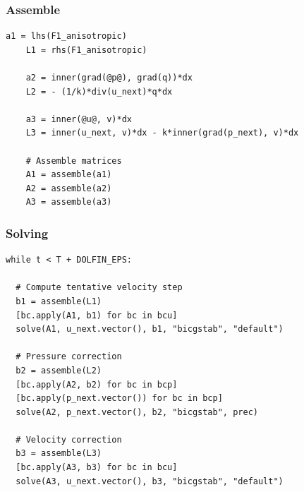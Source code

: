 \documentclass{beamer}
\begin{document}
\begin{frame}[fragile]
\frametitle{Assemble}
\scriptsize
\begin{lstlisting}[frame=single,style=base]
    a1 = lhs(F1_anisotropic)
    L1 = rhs(F1_anisotropic)

    a2 = inner(grad(@p@), grad(q))*dx
    L2 = - (1/k)*div(u_next)*q*dx

    a3 = inner(@u@, v)*dx
    L3 = inner(u_next, v)*dx - k*inner(grad(p_next), v)*dx

    # Assemble matrices
    A1 = assemble(a1)
    A2 = assemble(a2)
    A3 = assemble(a3)
\end{lstlisting}
\end{frame}




\begin{frame}[fragile]
\frametitle{Solving}
\scriptsize
\begin{lstlisting}[frame=single,style=base]
while t < T + DOLFIN_EPS:

  # Compute tentative velocity step
  b1 = assemble(L1)
  [bc.apply(A1, b1) for bc in bcu]
  solve(A1, u_next.vector(), b1, "bicgstab", "default")

  # Pressure correction
  b2 = assemble(L2)
  [bc.apply(A2, b2) for bc in bcp]
  [bc.apply(p_next.vector()) for bc in bcp]
  solve(A2, p_next.vector(), b2, "bicgstab", prec)

  # Velocity correction
  b3 = assemble(L3)
  [bc.apply(A3, b3) for bc in bcu]
  solve(A3, u_next.vector(), b3, "bicgstab", "default")
\end{lstlisting}
\end{frame}
\end{document}
